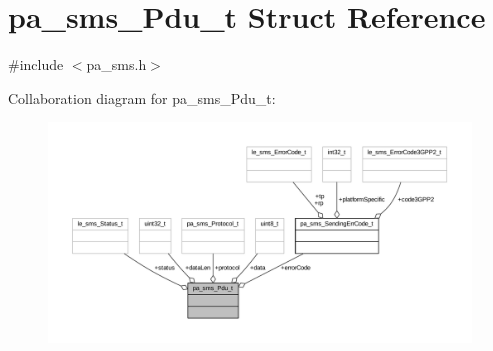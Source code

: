 \hypertarget{structpa__sms___pdu__t}{}\section{pa\+\_\+sms\+\_\+\+Pdu\+\_\+t Struct Reference}
\label{structpa__sms___pdu__t}


{\ttfamily \#include $<$pa\+\_\+sms.\+h$>$}



Collaboration diagram for pa\+\_\+sms\+\_\+\+Pdu\+\_\+t\+:
\nopagebreak
\begin{figure}[H]
\begin{center}
\leavevmode
\includegraphics[width=350pt]{structpa__sms___pdu__t__coll__graph}
\end{center}
\end{figure}
